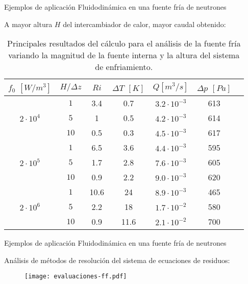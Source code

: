 \begin{frame}
{Ejemplos de aplicación}
{Fluidodinámica en una fuente fría de neutrones}

A mayor altura $H$ del intercambiador de calor, mayor caudal obtenido:

\begin{table}[h!]
  \centering
  \begin{tabular}{ c c c c c c c } 
      \hline
      \multicolumn{1}{c}{$f_0$ $[W/m^3]$} & \multicolumn{1}{c}{$H / \Delta z$} & \multicolumn{1}{c}{$Ri$} & \multicolumn{1}{c}{$\Delta T$ $[K]$} & \multicolumn{1}{c}{$Q$$[m^3/s]$}& \multicolumn{1}{c}{$\Delta p$ $[Pa]$} \\ \hline
      \multirow{3}{*}{$2\cdot10^4$} & $1$ & 3.4 & 0.7 & $3.2 \cdot 10^{-3}$ & 613 \\
                         & $5$ & 1 & 0.5 & $4.2 \cdot 10^{-3}$ & 614 \\
                         & $10$ & 0.5 & 0.3 & $4.5 \cdot 10^{-3}$ & 617 \\ \hline
      \multirow{3}{*}{$2\cdot10^5$} & $1$ & 6.5 & 3.6 & $4.4 \cdot 10^{-3}$ & 595 \\
                         & $5$ & 1.7 & 2.8 & $7.6 \cdot 10^{-3}$ & 605 \\
                         & $10$ & 0.9 & 2.2 & $9.0 \cdot 10^{-3}$ & 620 \\ \hline
      \multirow{3}{*}{$2\cdot10^6$} & $1$ & 10.6 & 24 & $8.9 \cdot 10^{-3}$ & 465 \\
                         & $5$ & 2.2 & 18 & $1.7 \cdot 10^{-2}$ & 580 \\
                         & $10$ & 0.9 & 11.6 & $2.1 \cdot 10^{-2}$ & 700 \\ \hline
   \end{tabular}   
   \caption[Principales resultados del cálculo para el análisis de la fuente fría variando la magnitud de la fuente interna y la altura del sistema de enfriamiento]
   {Principales resultados del cálculo para el análisis de la fuente fría variando la magnitud de la fuente interna y la altura del sistema de enfriamiento.}
   \label{tab-deuterio}
\end{table}

\end{frame}


\begin{frame}
{Ejemplos de aplicación}
{Fluidodinámica en una fuente fría de neutrones}

Análisis de métodos de resolución del sistema de ecuaciones de residuos:

\begin{figure}
\centering{}
\texttt{[image: evaluaciones-ff.pdf]}
\end{figure}

\end{frame}












